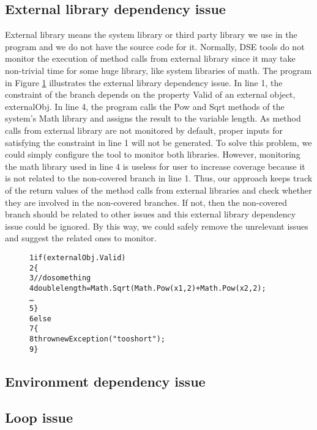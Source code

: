 \subsection{External library dependency issue}
External library means the system library or third party library we use in the program and we do not have the source code for it. Normally, DSE tools do not monitor the execution of method calls from external library since it may take non-trivial time for some huge library, like system libraries of math. The program in Figure \ref{fig:external} illustrates the external library dependency issue. In line 1, the constraint of the branch depends on the property Valid of an external object, externalObj. In line 4, the program calls the Pow and Sqrt methods of the system's Math library and assigns the result to the variable length. As method calls from external library are not monitored by default, proper inputs for satisfying the constraint in line 1 will not be generated. To solve this problem, we could simply configure the tool to monitor both libraries. However, monitoring the math library used in line 4 is useless for user to increase coverage because it is not related to the non-covered branch in line 1. Thus, our approach keeps track of the return values of the method calls from external libraries and check whether they are involved in the non-covered branches. If not, then the non-covered branch should be related to other issues and this external library dependency issue could be ignored. By this way, we could safely remove the unrelevant issues and suggest the related ones to monitor.
\begin{figure}
\begin{CodeOut}
\begin{alltt}
1   if(externalObj.Valid)
2   \{
3       // do some thing
4       double length = Math.Sqrt(Math.Pow(x1, 2) + Math.Pow(x2, 2);
        \ldots
5   \}
6   else
7   \{
8       throw new Exception("too short");
9   \}
\end{alltt}
\end{CodeOut}
\label{fig:external}
\end{figure}
\subsection{Environment dependency issue}
\subsection{Loop issue}


   